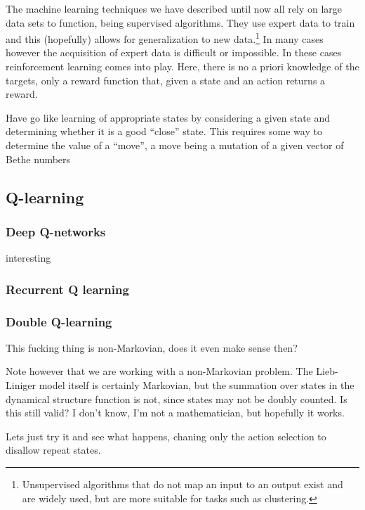\documentclass[11pt, a4paper]{report} %
\begin{document}
The machine learning techniques we have described until now all rely on large data sets to function, being supervised algorithms.
They use expert data to train and this (hopefully) allows for generalization to new data.\footnote{Unsupervised algorithms that do not map an input to an output exist and are widely used, but are more suitable for tasks such as clustering.}
In many cases however the acquisition of expert data is difficult or impossible.
In these cases reinforcement learning comes into play.
Here, there is no a priori knowledge of the targets, only a reward function that, given a state and an action returns a reward.

Have go like learning of appropriate states by considering a given state and determining whether it is a good ``close'' state.
This requires some way to determine the value of a ``move'', a move being a mutation of a given vector of Bethe numbers\cite{Silver2017}

\subsection{Q-learning}

\subsubsection{Deep Q-networks}

interesting\cite{mnih13_playin_atari_with_deep_reinf_learn,lillicrap15_contin_contr_with_deep_reinf_learn}

\subsubsection{Recurrent Q learning}
\cite{hausknecht15_deep_recur_q_learn_partial_obser_mdps}
\subsubsection{Double Q-learning}
\cite{hasselt15_deep_reinf_learn_with_doubl_q_learn}

This fucking thing is non-Markovian, does it even make sense then?

Note however that we are working with a non-Markovian problem.
The Lieb-Liniger model itself is certainly Markovian, but the summation over states in the dynamical structure function is not, since states may not be doubly counted.
Is this still valid?
I don't know, I'm not a mathematician, but hopefully it works.

Lets just try it and see what happens, chaning only the action selection to disallow repeat states.
\end{document}

